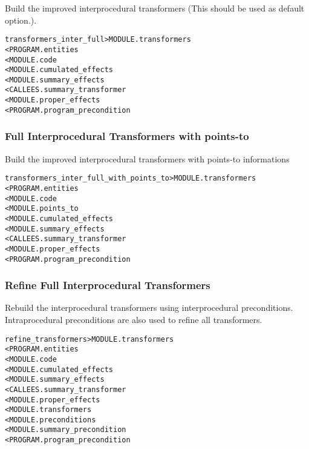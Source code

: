 \documentclass[a4paper]{report}
\newenvironment{PipsMake}{\begin{alltt}}{\end{alltt}}
\newenvironment{PipsPass}[1]{\label{pass:#1}}{}
\begin{document}
\begin{PipsPass}{transformers_inter_full}
Build the improved interprocedural transformers (This should be used
as default option.).
\end{PipsPass}

\begin{PipsMake}
transformers_inter_full         > MODULE.transformers
        < PROGRAM.entities
        < MODULE.code
        < MODULE.cumulated_effects
        < MODULE.summary_effects
        < CALLEES.summary_transformer
        < MODULE.proper_effects
        < PROGRAM.program_precondition
\end{PipsMake}

\subsubsection{Full Interprocedural Transformers with points-to}

\begin{PipsPass}{transformers_inter_full_with_points_to}
Build the improved interprocedural transformers with points-to informations
\end{PipsPass}

\begin{PipsMake}
transformers_inter_full_with_points_to         > MODULE.transformers
        < PROGRAM.entities
        < MODULE.code
        < MODULE.points_to
        < MODULE.cumulated_effects
        < MODULE.summary_effects
        < CALLEES.summary_transformer
        < MODULE.proper_effects
        < PROGRAM.program_precondition
\end{PipsMake}

\subsubsection{Refine Full Interprocedural Transformers}

\begin{PipsPass}{refine_transformers}
Rebuild the interprocedural transformers using interprocedural
preconditions. Intraprocedural preconditions are also used to refine all
transformers.
\end{PipsPass}

\begin{PipsMake}
refine_transformers         > MODULE.transformers
        < PROGRAM.entities
        < MODULE.code
        < MODULE.cumulated_effects
        < MODULE.summary_effects
        < CALLEES.summary_transformer
        < MODULE.proper_effects
        < MODULE.transformers
        < MODULE.preconditions
        < MODULE.summary_precondition
        < PROGRAM.program_precondition
\end{PipsMake}
\end{document}
